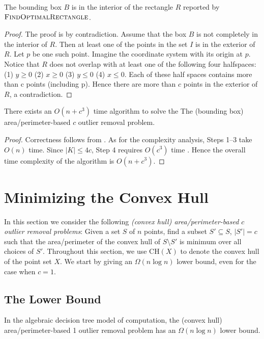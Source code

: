 \documentclass[lotsofwhite]{patmorin}
\newcommand{\ch}{\mathrm{CH}}
\begin{document}
\begin{lem}\label{bounding-box-obs}
 The bounding box $B$ is in the interior of the rectangle $R$ reported
 by $\textsc{FindOptimalRectangle}$.
\end{lem}
\begin{proof}
The proof is by contradiction. 
Assume that the box $B$ is not completely in
the interior of $R$. Then at least one of the points in the set $I$ is in the
exterior of $R$. Let $p$ be one such point. Imagine the coordinate
system with its origin at $p$.
Notice that  $R$ does not overlap with at least one of the following four
halfspaces: (1) $y\ge 0$ (2) $x\ge 0$ (3) $y\le 0$  (4) $x\le 0$.  
Each of these half spaces contains more than c points (including p).
Hence there are more than $c$ points in the exterior of $R$, a contradiction.
\end{proof}

\begin{thm}
There exists an $O(n+c^3)$ time algorithm to solve the 
The (bounding box) area/perimeter-based $c$ outlier removal problem.
\end{thm}

\begin{proof}
Correctness follows from . As for the complexity
analysis, Steps 1--3 take $O(n)$ time. Since $|K|\le 4c$, Step 4
requires $O(c^3)$ time \cite{sk98}. Hence the overall
time complexity of the algorithm is $O(n+c^3)$.
\end{proof}

\section{Minimizing the Convex Hull}

In this section we consider the following \emph{(convex hull)
area/perimeter-based $c$ outlier removal problems}:  Given a set $S$
of $n$ points, find a subset $S'\subseteq S$, $|S'|=c$ such that the
area/perimeter of the convex hull of $S\setminus S'$ is minimum over
all choices of $S'$.  Throughout this section, we use $\ch(X)$ to
denote the convex hull of the point set $X$. We start by giving an
$\Omega(n\log n)$ lower bound, even for the case when $c=1$.


\subsection{The Lower Bound}


\begin{thm}
In the algebraic decision tree model of computation, the (convex hull)
area/perimeter-based 1 outlier removal problem has an 
$\Omega(n\log n)$ lower bound.
\end{thm}
\end{document}
